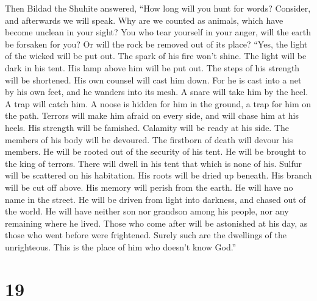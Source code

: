  Then Bildad the Shuhite answered,  ``How
long will you hunt for words? Consider, and afterwards we will speak.
 Why are we counted as animals, which have become unclean
in your sight?  You who tear yourself in your anger, will
the earth be forsaken for you? Or will the rock be removed out of its
place?  ``Yes, the light of the wicked will be put out.
The spark of his fire won't shine.  The light will be dark
in his tent. His lamp above him will be put out.  The
steps of his strength will be shortened. His own counsel will cast him
down.  For he is cast into a net by his own feet, and he
wanders into its mesh.  A snare will take him by the heel.
A trap will catch him.  A noose is hidden for him in the
ground, a trap for him on the path.  Terrors will make
him afraid on every side, and will chase him at his heels.
 His strength will be famished. Calamity will be ready at
his side.  The members of his body will be devoured. The
firstborn of death will devour his members.  He will be
rooted out of the security of his tent. He will be brought to the king
of terrors.  There will dwell in his tent that which is
none of his. Sulfur will be scattered on his habitation. 
His roots will be dried up beneath. His branch will be cut off above.
 His memory will perish from the earth. He will have no
name in the street.  He will be driven from light into
darkness, and chased out of the world.  He will have
neither son nor grandson among his people, nor any remaining where he
lived.  Those who come after will be astonished at his
day, as those who went before were frightened.  Surely
such are the dwellings of the unrighteous. This is the place of him who
doesn't know God.''

\hypertarget{section-13}{%
\section{19}\label{section-13}}

